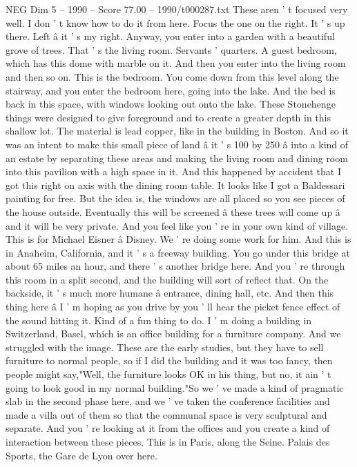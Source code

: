 \begin{textsample}{NEG Dim 5 – 1990 – Score 77.00 – 1990/t000287.txt}
These aren ' t focused very well.
I don ' t know how to do it from here.
Focus the one on the right.
It ' s up there.
Left â it ' s my right.
Anyway, you enter into a garden with a beautiful grove of trees.
That ' s the living room.
Servants ' quarters.
A guest bedroom, which has this dome with marble on it.
And then you enter into the living room and then so on.
This is the bedroom.
You come down from this level along the stairway, and you enter the bedroom here, going into the lake.
And the bed is back in this space, with windows looking out onto the lake.
These Stonehenge things were designed to give foreground and to create a greater depth in this shallow lot.
The material is lead copper, like in the building in Boston.
And so it was an intent to make this small piece of land â it ' s 100 by 250 â into a kind of an estate by separating these areas and making the living room and dining room into this pavilion with a high space in it.
And this happened by accident that I got this right on axis with the dining room table.
It looks like I got a Baldessari painting for free.
But the idea is, the windows are all placed so you see pieces of the house outside.
Eventually this will be screened â these trees will come up â and it will be very private.
And you feel like you ' re in your own kind of village.
This is for Michael Eisner â Disney.
We ' re doing some work for him.
And this is in Anaheim, California, and it ' s a freeway building.
You go under this bridge at about 65 miles an hour, and there ' s another bridge here.
And you ' re through this room in a split second, and the building will sort of reflect that.
On the backside, it ' s much more humane â entrance, dining hall, etc.
And then this thing here â I ' m hoping as you drive by you ' ll hear the picket fence effect of the sound hitting it.
Kind of a fun thing to do.
I ' m doing a building in Switzerland, Basel, which is an office building for a furniture company.
And we struggled with the image.
These are the early studies, but they have to sell furniture to normal people, so if I did the building and it was too fancy, then people might say,"Well, the furniture looks OK in his thing, but no, it ain ' t going to look good in my normal building."So we ' ve made a kind of pragmatic slab in the second phase here, and we ' ve taken the conference facilities and made a villa out of them so that the communal space is very sculptural and separate.
And you ' re looking at it from the offices and you create a kind of interaction between these pieces.
This is in Paris, along the Seine.
Palais des Sports, the Gare de Lyon over here.

\end{textsample}
